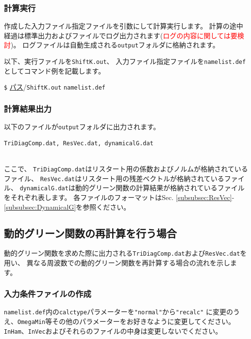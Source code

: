 \documentclass[12pt,titlepage]{jarticle}
\begin{document}
\subsubsection*{計算実行}
作成した入力ファイル指定ファイルを引数にして計算実行します。
計算の途中経過は標準出力およびファイルでログ出力されます(\textcolor{red}{ログの内容に関しては要検討})。
ログファイルは自動生成される\verb|output|フォルダに格納されます。

以下、実行ファイルを\verb|ShiftK.out|、
入力ファイル指定ファイルを\verb|namelist.def|としてコマンド例を記載します。

\verb|$| \underline{パス}/\verb|ShiftK.out| \verb|namelist.def|

\subsubsection*{計算結果出力}
以下のファイルが\verb|output|フォルダに出力されます。
\\
\begin{minipage}{11cm}
\begin{screen}
\begin{verbatim}
TriDiagComp.dat, ResVec.dat, dynamicalG.dat
\end{verbatim}
\end{screen}
\end{minipage}
\\
ここで、
\verb|TriDiagComp.dat|はリスタート用の係数およびノルムが格納されているファイル、
\verb|ResVec.dat|はリスタート用の残差ベクトルが格納されているファイル、
\verb|dynamicalG.dat|は動的グリーン関数の計算結果が格納されているファイルをそれぞれ表します。
各ファイルのフォーマットはSec. \ref{subsubsec:ResVec}-\ref{subsubsec:DynamicalG}を参照ください。

\subsection{動的グリーン関数の再計算を行う場合}
動的グリーン関数を求めた際に出力される\verb|TriDiagComp.dat|および\verb|ResVec.dat|を用い、
異なる周波数での動的グリーン関数を再計算する場合の流れを示します。
\subsubsection*{入力条件ファイルの作成}
\verb|namelist.def|内の\verb|calctype|パラメーターを\verb|"normal"|から\verb|"recalc"|
に変更のうえ、\verb|OmegaMin|等その他のパラメーターをお好きなように変更してください。
\verb|InHam|、\verb|InVec|およびそれらのファイルの中身は変更しないでください。
\end{document}

